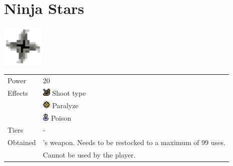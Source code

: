 \section{Ninja Stars}
\label{weapon:ninja_stars}

\includegraphics[height=2cm,keepaspectratio]{./resources/weapons/ninjastars}

\begin{longtable}{ l p{9cm} }
	Power
	& 20
\\ %
	Effects
	& \includegraphics[height=1em,keepaspectratio]{./resources/effects/shoot}
	Shoot type \\
	& \includegraphics[height=1em,keepaspectratio]{./resources/effects/paralyze}
	Paralyze \\
	& \includegraphics[height=1em,keepaspectratio]{./resources/effects/poison}
	Poison
\\ %
	Tiers
	& -
\\ %
	Obtained
	& \nameref{char:tristam}’s weapon. Needs to be restocked to a maximum of 99 uses. \\
	& Cannot be used by the player.
\end{longtable}
